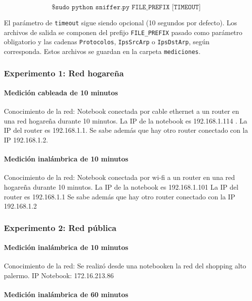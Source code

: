 \[
\texttt{\$ sudo python sniffer.py FILE\_PREFIX [TIMEOUT]}
\]

El parámetro de \texttt{timeout} sigue siendo opcional (10 segundos por defecto). Los archivos de salida
se componen del prefijo \texttt{FILE\_PREFIX} pasado como parámetro obligatorio y las cadenas \texttt{Protocolos},
\texttt{IpsSrcArp} o \texttt{IpsDstArp}, según corresponda. Estos archivos se guardan en la carpeta \texttt{mediciones}.


\subsubsection{Experimento 1: Red hogareña}
\paragraph{Medición cableada de 10 minutos}

Conocimiento de la red: 
Notebook conectada por cable ethernet a un router en una red hogareña durante 10 minutos.
La IP de la notebook es 192.168.1.114 .
La IP del router es 192.168.1.1.
Se sabe además que hay otro router conectado con la IP 192.168.1.2.


\paragraph{Medición inalámbrica de 10 minutos}

Conocimiento de la red:
Notebook conectada por wi-fi a un router en una red hogareña durante 10 minutos.
La IP de la notebook es 192.168.1.101
La IP del router es 192.168.1.1
Se sabe además que hay otro router conectado con la IP 192.168.1.2

\subsubsection{Experimento 2: Red pública}
\paragraph{Medición inalámbrica de 10 minutos}

Conocimiento de la red:
Se realizó desde una notebooken la red del shopping alto palermo.
IP Notebook: 172.16.213.86

\paragraph{Medición inalámbrica de 60 minutos}

